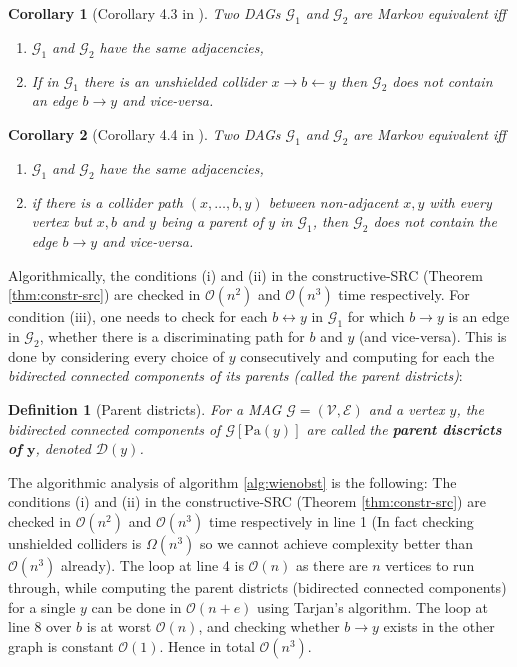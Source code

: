 \documentclass[a4paper]{article}
\newtheorem{definition}{Definition}
\newtheorem{corollary}{Corollary}
\begin{document}
\begin{corollary}[Corollary 4.3 in \cite{wienobst2022}]Two DAGs $\mathcal{G}_1$ and $\mathcal{G}_2$ are Markov equivalent iff
	\begin{enumerate}
		\item $\mathcal{G}_1$ and $\mathcal{G}_2$ have the same adjacencies,
		\item If in $\mathcal{G}_1$ there is an unshielded collider $x \rightarrow b \leftarrow y$ then $\mathcal{G}_2$ does not contain an edge $b \rightarrow y$ and vice-versa.
	\end{enumerate}
\end{corollary}

\begin{corollary}[Corollary 4.4 in \cite{wienobst2022}] Two DAGs $\mathcal{G}_1$ and $\mathcal{G}_2$ are Markov equivalent iff
	\begin{enumerate}
		\item $\mathcal{G}_1$ and $\mathcal{G}_2$ have the same adjacencies,
		\item if there is a collider path $(x,\ldots,b,y)$ between non-adjacent $x,y$ with every vertex but $x,b$ and $y$ being a parent of $y$ in $\mathcal{G}_1$, then $\mathcal{G}_2$ does not contain the edge $b \rightarrow y$ and vice-versa.
	\end{enumerate}
\end{corollary}

Algorithmically, the conditions (i) and (ii) in the constructive-SRC (Theorem \ref{thm:constr-src}) are checked in $\mathcal{O}(n^2)$ and $\mathcal{O}(n^3)$ time respectively. For condition (iii), one needs to check for each $b \leftrightarrow y$ in $\mathcal{G}_1$ for which $b \rightarrow y$ is an edge in $\mathcal{G}_2$, whether there is a discriminating path for $b$ and $y$ (and vice-versa). This is done by considering every choice of $y$ consecutively and computing for each the \textit{bidirected connected components of its parents (called the parent districts)}:

\begin{definition}[Parent districts]For a MAG $\mathcal{G} = (\mathcal{V},\mathcal{E})$ and a vertex $y$, the bidirected connected components of $\mathcal{G}[\text{Pa}(y)]$ are called the \textbf{parent discricts of} $\mathbf{y}$, denoted $\mathcal{D}(y)$.
\end{definition} 

The algorithmic analysis of algorithm \ref{alg:wienobst} is the following: The conditions (i) and (ii) in the constructive-SRC (Theorem \ref{thm:constr-src}) are checked in $\mathcal{O}(n^2)$ and $\mathcal{O}(n^3)$ time respectively in line 1 (In fact checking unshielded colliders is $\Omega(n^3)$ so we cannot achieve complexity better than $\mathcal{O}(n^3)$ already). The loop at line 4 is $\mathcal{O}(n)$ as there are $n$ vertices to run through, while computing the parent districts (bidirected connected components) for a single $y$ can be done in $\mathcal{O}(n+e)$ using Tarjan's algorithm. The loop at line $8$ over $b$ is at worst $\mathcal{O}(n)$, and checking whether $b \rightarrow y$ exists in the other graph is constant $\mathcal{O}(1)$. Hence in total $\mathcal{O}(n^3)$. 
\end{document}
